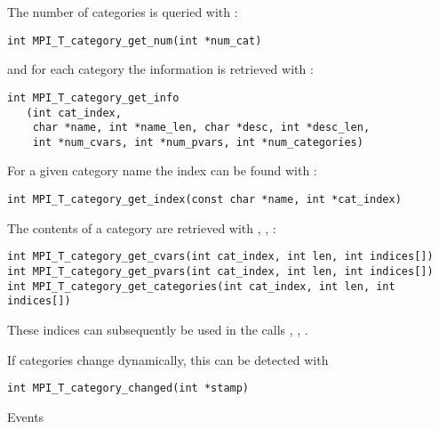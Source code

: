 The number of categories is queried with
:
\begin{lstlisting}
int MPI_T_category_get_num(int *num_cat)
\end{lstlisting}
and for each category the information is retrieved with
:
\begin{lstlisting}
int MPI_T_category_get_info
   (int cat_index,
    char *name, int *name_len, char *desc, int *desc_len, 
    int *num_cvars, int *num_pvars, int *num_categories)
\end{lstlisting}
For a given category name the index can be found with
:
\begin{lstlisting}
int MPI_T_category_get_index(const char *name, int *cat_index)
\end{lstlisting}

The contents of a category are retrieved with
,
,
:
\begin{lstlisting}
int MPI_T_category_get_cvars(int cat_index, int len, int indices[])
int MPI_T_category_get_pvars(int cat_index, int len, int indices[])
int MPI_T_category_get_categories(int cat_index, int len, int indices[])
\end{lstlisting}

\begin{raggedlist}
  These indices can subsequently be used in the calls
  ,
  ,
  .
\end{raggedlist}

If categories change dynamically, this can be detected with
\begin{lstlisting}
int MPI_T_category_changed(int *stamp)
\end{lstlisting}

 {Events}



